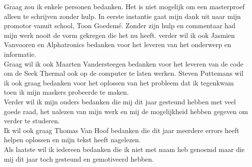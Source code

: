 Graag zou ik enkele personen bedanken. Het is niet mogelijk om een masterproef alleen te schrijven zonder hulp. In eerste instantie gaat mijn dank uit naar mijn promotor vanuit school, Toon Goedem\'e. Zonder zijn hulp en commentaar had mijn werk nooit de vorm gekregen die het nu heeft. verder wil ik ook Jasmien Vanvooren en Alphatronics bedanken voor het leveren van het onderwerp en informatie. \\
Graag wil ik ook Maarten Vandersteegen bedanken voor het leveren van de code om de Seek Thermal ook op de computer te laten werken. Steven Puttemans wil ik ook graag bedanken voor het oplossen van het probleem dat ik tegenkwam toen ik mijn maskers probeerde te maken.\\
Verder wil ik mijn ouders bedanken die mij dit jaar gesteund hebben met veel goede raad, het nalezen van mijn werk en mij de mogelijkheid hebben gegeven om verder te studeren. \\
Ik wil ook graag Thomas Van Hoof bedanken die dit jaar meerdere errors heeft helpen oplossen en mijn tekst heeft nagelezen.\\
Als laatste wil ik iedereen bedanken die ik niet met naam heb genoemd maar die mij dit jaar toch gesteund en gemotiveerd hebben.
